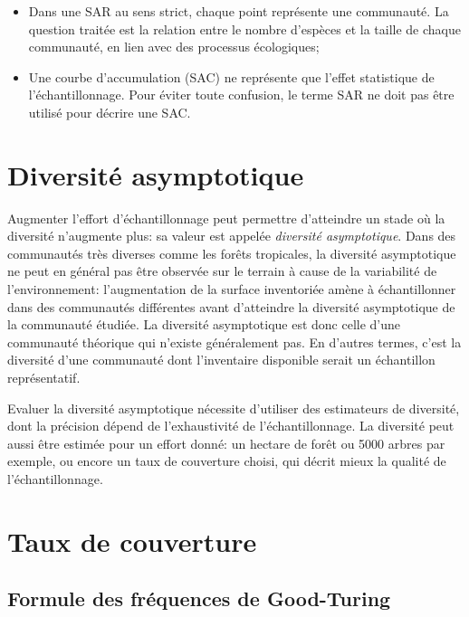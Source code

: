 \documentclass[
  11pt,
  french,
  a4paper,
  extrafontsizes,onecolumn,openright
  ]{memoir}
\providecommand{\tightlist}{%
  \setlength{\itemsep}{0pt}\setlength{\parskip}{0pt}}
\newlength{\rf}
\begin{document}
\begin{itemize}
\tightlist
\item
  Dans une SAR au sens strict, chaque point représente une communauté.
  La question traitée est la relation entre le nombre d'espèces et la taille de chaque communauté, en lien avec des processus écologiques;
\item
  Une courbe d'accumulation (SAC) ne représente que l'effet statistique de l'échantillonnage.
  Pour éviter toute confusion, le terme SAR ne doit pas être utilisé pour décrire une SAC.
\end{itemize}

\hypertarget{diversituxe9-asymptotique}{%
\section{Diversité asymptotique}\label{diversituxe9-asymptotique}}

Augmenter l'effort d'échantillonnage peut permettre d'atteindre un stade où la diversité n'augmente plus: sa valeur est appelée \emph{diversité asymptotique}.
Dans des communautés très diverses comme les forêts tropicales, la diversité asymptotique ne peut en général pas être observée sur le terrain à cause de la variabilité de l'environnement: l'augmentation de la surface inventoriée amène à échantillonner dans des communautés différentes avant d'atteindre la diversité asymptotique de la communauté étudiée.
La diversité asymptotique est donc celle d'une communauté théorique qui n'existe généralement pas.
En d'autres termes, c'est la diversité d'une communauté dont l'inventaire disponible serait un échantillon représentatif.

Evaluer la diversité asymptotique nécessite d'utiliser des estimateurs de diversité, dont la précision dépend de l'exhaustivité de l'échantillonnage.
La diversité peut aussi être estimée pour un effort donné: un hectare de forêt ou 5000 arbres par exemple, ou encore un taux de couverture choisi, qui décrit mieux la qualité de l'échantillonnage.

\hypertarget{sec-Couverture}{%
\section{Taux de couverture}\label{sec-Couverture}}

\hypertarget{formule-des-fruxe9quences-de-good-turing}{%
\subsection{Formule des fréquences de Good-Turing}\label{formule-des-fruxe9quences-de-good-turing}}
\end{document}
